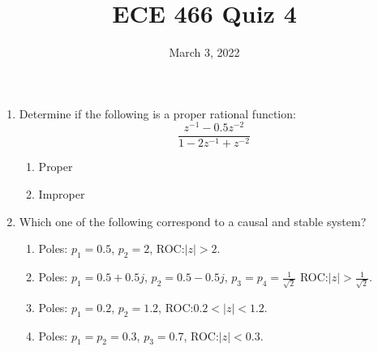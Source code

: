 \documentclass{article}
\date{March 3, 2022}
\begin{document}
 
\title{ECE 466 Quiz 4}
 
\maketitle
 
\begin{enumerate}
    \item Determine if the following is a proper rational function:
    \[\frac{z^{-1}-0.5z^{-2}}{1-2z^{-1}+z^{-2}}\]
    \begin{enumerate}
        \item Proper
        \item Improper
    \end{enumerate}

    \item Which one of the following correspond to a causal and stable system?
    \begin{enumerate}
        \item Poles: $p_1=0.5$, $p_2=2$, ROC:$|z|>2$.
        \item Poles: $p_1=0.5+0.5j$, $p_2=0.5-0.5j$, $p_3=p_4=\frac{1}{\sqrt{2}}$ ROC:$|z|>\frac{1}{\sqrt{2}}$.
        \item Poles: $p_1=0.2$, $p_2=1.2$, ROC:$0.2<|z|<1.2$.
        \item Poles: $p_1=p_2=0.3$, $p_3=0.7$, ROC:$|z|<0.3$.
    \end{enumerate}

\end{enumerate}
\end{document}
